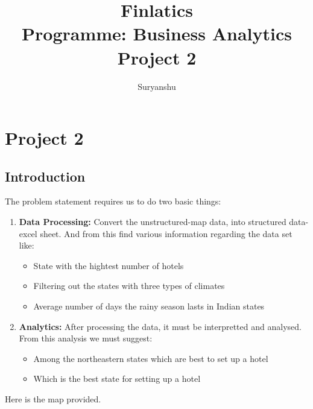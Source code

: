 \documentclass{report}
\title{\textbf{Finlatics \\ Programme: Business Analytics \\ Project 2}}
\author{Suryanshu}
\begin{document}
\maketitle
\tableofcontents

\chapter{Project 2 }
\section{Introduction}
The problem statement requires us to do two basic things:
\begin{enumerate}
  \item \textbf{Data Processing:} Convert the unstructured-map data, into structured data-excel sheet. And from this find various information regarding the data set like:
  \begin{itemize}
    \item State with the hightest number of hotels
    \item Filtering out the states with three types of climates
    \item Average number of days the rainy season lasts in Indian states
  \end{itemize}
\item \textbf{Analytics:} After processing the data, it must be interpretted and analysed. From this analysis we must suggest:
  \begin{itemize}
    \item Among the northeastern states which are best to set up a hotel
    \item Which is the best state for setting up a hotel
  \end{itemize}
\end{enumerate}
\newpage
Here is the map provided.
\end{document}
